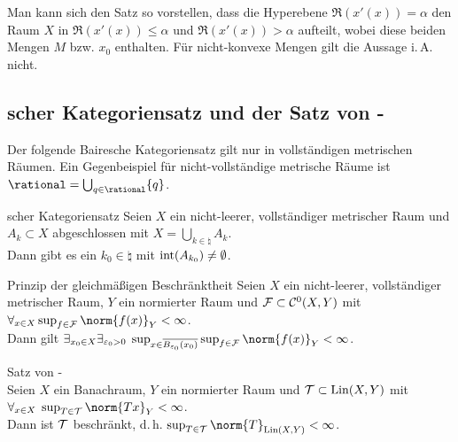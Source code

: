 \begin{Bem}
    Man kann sich den Satz so vorstellen, dass die Hyperebene $\Re(x'(x)) = \alpha$
    den Raum $X$ in $\Re(x'(x)) \le \alpha$ und $\Re(x'(x)) > \alpha$ aufteilt, wobei diese beiden
    Mengen $M$ bzw. $x_0$ enthalten.
    Für nicht-konvexe Mengen gilt die Aussage i.\,A. nicht.
\end{Bem}

\pagebreak

\subsection{%
    scher Kategoriensatz und der Satz von -%
}

\begin{Bem}
    Der folgende Bairesche Kategoriensatz gilt nur in vollständigen metrischen Räumen.
    Ein Gegenbeispiel für nicht-vollständige metrische Räume
    ist $\rational = \bigcup_{q \in \rational} \{q\}$.
\end{Bem}

\begin{Satz}{scher Kategoriensatz}
    Seien $X$ ein nicht-leerer, vollständiger metrischer Raum und $A_k \subset X$ abgeschlossen
    mit $X = \bigcup_{k \in \natural} A_k$.\\
    Dann gibt es ein $k_0 \in \natural$ mit $\operatorname{int}(A_{k_0}) \not= \emptyset$.
\end{Satz}

\begin{Satz}{Prinzip der gleichmäßigen Beschränktheit}
    Seien $X$ ein nicht-leerer, vollständiger metrischer Raum, $Y$ ein normierter Raum und
    $\mathcal{F} \subset \mathcal{C}^0(X, Y)$ mit $\forall_{x \in X} \sup_{f \in \F} \norm{f(x)}_Y < \infty$.\\
    Dann gilt $\exists_{x_0 \in X} \exists_{\varepsilon_0 > 0}\;
    \sup_{x \in \overline{B_{\varepsilon_0}(x_0)}} \sup_{f \in \F} \norm{f(x)}_Y < \infty$.
\end{Satz}

\begin{Satz}{Satz von -}\\
    Seien $X$ ein Banachraum, $Y$ ein normierter Raum und
    $\mathcal{T} \subset \operatorname{Lin}(X, Y)$ mit\\
    $\forall_{x \in X}\; \sup_{T \in \T} \norm{Tx}_Y < \infty$.\\
    Dann ist $\mathcal{T}$ beschränkt, d.\,h. $\sup_{T \in \T} \norm{T}_{\Lin(X, Y)} < \infty$.
\end{Satz}

